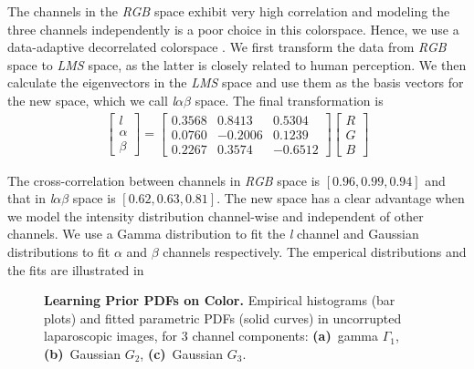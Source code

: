 The channels in the \emph{RGB} space exhibit very high correlation and modeling the three channels independently is a poor choice in this colorspace. Hence, we use a data-adaptive decorrelated colorspace \cite{reinhard2001color}. We first transform the data from \emph{RGB} space to \emph{LMS} space, as the latter is closely related to human perception. We then calculate the eigenvectors in the \emph{LMS} space and use them as the basis vectors for the new space, which we call \emph{l$\alpha\beta$} space. The final transformation is 
\begin{align}
    \begin{bmatrix}
    l \\ \alpha \\ \beta
    \end{bmatrix}
    = 
    \begin{bmatrix}
    0.3568 & 0.8413 & 0.5304 \\
    0.0760 & -0.2006 & 0.1239 \\
    0.2267 & 0.3574 & -0.6512  
    \end{bmatrix}
    \begin{bmatrix}
    R \\ G \\ B
    \end{bmatrix}
\end{align}

The cross-correlation between channels in \emph{RGB} space is $\left[ 0.96, 0.99, 0.94\right]$ and that in \emph{l$\alpha\beta$} space is $\left[ 0.62, 0.63, 0.81 \right]$. The new space has a clear advantage when we model the intensity distribution channel-wise and independent of other channels. We use a Gamma distribution to fit the \textit{l} channel and Gaussian distributions to fit $\alpha$ and $\beta$ channels respectively. The emperical distributions and the fits are illustrated in 

\begin{figure}[!t]
    \caption
    {
        {\bf Learning Prior PDFs on Color.}
        Empirical histograms (bar plots) and fitted parametric PDFs (solid curves) in uncorrupted laparoscopic images, for 3 channel components: {\bf
            (a)}~gamma $\Gamma_1$, {\bf (b)}~Gaussian $G_2$, {\bf (c)}~Gaussian $G_3$.
    }
    \label{fig:intensityDist}
\end{figure}


